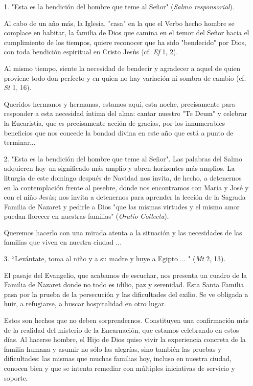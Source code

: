 1. "Esta es la bendición del hombre que teme al Señor" (\emph{Salmo
	responsorial}).

Al cabo de un año más, la Iglesia, "casa" en la que el Verbo hecho
hombre se complace en habitar, la familia de Dios que camina en el temor
del Señor hacia el cumplimiento de los tiempos, quiere reconocer que ha
sido "bendecido" por Dios, con toda bendición espiritual en Cristo Jesús
(cf. \emph{Ef} 1, 2).

Al mismo tiempo, siente la necesidad de bendecir y agradecer a aquel de
quien proviene todo don perfecto y en quien no hay variación ni sombra
de cambio (cf. \emph{St} 1, 16).

Queridos hermanos y hermanas, estamos aquí, esta noche, precisamente
para responder a esta necesidad íntima del alma: cantar nuestro "Te
Deum" y celebrar la Eucaristía, que es precisamente acción de gracias,
por los innumerables beneficios que nos concede la bondad divina en este
año que está a punto de terminar...

2. "Esta es la bendición del hombre que teme al Señor". Las palabras del
Salmo adquieren hoy un significado más amplio y abren horizontes más
amplios. La liturgia de este domingo después de Navidad nos invita, de
hecho, a detenernos en la contemplación frente al pesebre, donde nos
encontramos con María y José y con el niño Jesús; nos invita a
detenernos para aprender la lección de la Sagrada Familia de Nazaret y
pedirle a Dios "que las mismas virtudes y el mismo amor puedan florecer
en nuestras familias" (\emph{Oratio Collecta}).

Queremos hacerlo con una mirada atenta a la situación y las necesidades
de las familias que viven en nuestra ciudad ...

3. ``Levántate, toma al niño y a su madre y huye a Egipto ... "
(\emph{Mt} 2, 13).

El pasaje del Evangelio, que acabamos de escuchar, nos presenta un
cuadro de la Familia de Nazaret donde no todo es idilio, paz y
serenidad. Esta Santa Familia pasa por la prueba de la persecución y las
dificultades del exilio. Se ve obligada a huir, a refugiarse, a buscar
hospitalidad en otro lugar.

Estos son hechos que no deben sorprendernos. Constituyen una
confirmación más de la realidad del misterio de la Encarnación, que
estamos celebrando en estos días. Al hacerse hombre, el Hijo de Dios
quiso vivir la experiencia concreta de la familia humana y asumir no
sólo las alegrías, sino también las pruebas y dificultades: las mismas
que muchas familias hoy, incluso en nuestra ciudad, conocen bien y que
se intenta remediar con múltiples iniciativas de servicio y soporte.

